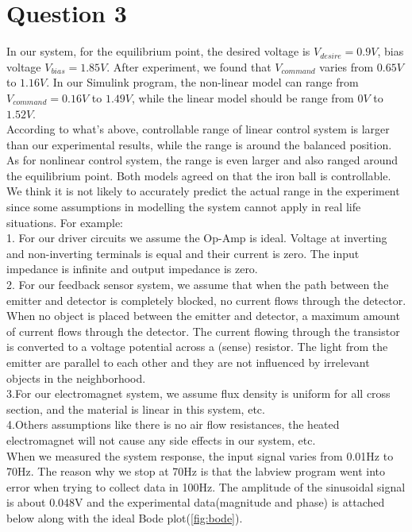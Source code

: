\documentclass[letterpaper]{article}
\begin{document}
\section*{Question 3}
In our system, for the equilibrium point, the desired voltage is $V_{desire}=0.9 V$, bias voltage $V_{bias}= 1.85 V$. After experiment, we found that $V_{command}$ varies from $0.65V$ to $1.16V$. In our Simulink program, the non-linear model can range from $V_{command}= 0.16V$ to $1.49V$, while the linear model should be range from $0V$ to $1.52V$.\\
According to what’s above, controllable range of linear control system is larger than our experimental results, while the range is around the balanced position. As for nonlinear control system, the range is even larger and also ranged around the equilibrium point. Both models agreed on that the iron ball is controllable.\\
We think it is not likely to accurately predict the actual range in the experiment since some assumptions in modelling the system cannot apply in real life situations. For example:\\ 
1. For our driver circuits we assume the Op-Amp is ideal. Voltage at inverting and non-inverting terminals is equal and their current is zero. The input impedance is infinite and output impedance is zero.\\
2. For our feedback sensor system, we assume that when the path between the emitter and detector is completely blocked, no current flows through the detector. When no object is placed between the emitter and detector, a maximum amount of current flows through the detector. The current flowing through the transistor is converted to a voltage potential across a (sense) resistor. The light from the emitter are parallel to each other and they are not influenced by irrelevant objects in the neighborhood. \\
3.For our electromagnet system, we assume flux density is uniform for all cross section, and the material is linear in this system, etc.\\
4.Others assumptions like there is no air flow resistances, the heated electromagnet will not cause any side effects in our system, etc.\\
When we measured the system response, the input signal varies from 0.01Hz to 70Hz. The reason why we stop at 70Hz is that the labview program went into error when trying to collect data in 100Hz. The amplitude of the sinusoidal signal is about 0.048V and the experimental data(magnitude and phase) is attached below along with the ideal Bode plot(\ref{fig:bode}).
\end{document}
